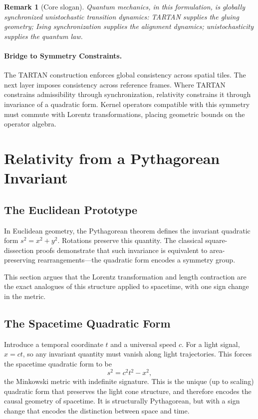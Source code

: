 \documentclass[12pt]{article}
\newtheorem{remark}[theorem]{Remark}
\begin{document}
\begin{remark}[Core slogan]
Quantum mechanics, in this formulation, is globally synchronized unistochastic
transition dynamics: TARTAN supplies the gluing geometry; Ising synchronization
supplies the alignment dynamics; unistochasticity supplies the quantum law.
\end{remark}

\paragraph{Bridge to Symmetry Constraints.}
The TARTAN construction enforces global consistency across spatial tiles.
The next layer imposes consistency across reference frames. Where TARTAN
constrains admissibility through synchronization, relativity constrains
it through invariance of a quadratic form. Kernel operators compatible
with this symmetry must commute with Lorentz transformations, placing
geometric bounds on the operator algebra.

\section{Relativity from a Pythagorean Invariant}
\label{sec:relativity}

\subsection{The Euclidean Prototype}

In Euclidean geometry, the Pythagorean theorem defines the invariant
quadratic form $s^2 = x^2 + y^2$. Rotations preserve this quantity.
The classical square-dissection proofs demonstrate that such invariance
is equivalent to area-preserving rearrangements---the quadratic form
encodes a symmetry group.

This section argues that the Lorentz transformation and length contraction
are the exact analogues of this structure applied to spacetime, with one
sign change in the metric.

\subsection{The Spacetime Quadratic Form}

Introduce a temporal coordinate $t$ and a universal speed $c$. For a
light signal, $x = ct$, so any invariant quantity must vanish along light
trajectories. This forces the spacetime quadratic form to be
\[
  s^2 = c^2 t^2 - x^2,
\]
the Minkowski metric with indefinite signature. This is the unique
(up to scaling) quadratic form that preserves the light cone structure,
and therefore encodes the causal geometry of spacetime. It is structurally
Pythagorean, but with a sign change that encodes the distinction between
space and time.
\end{document}

